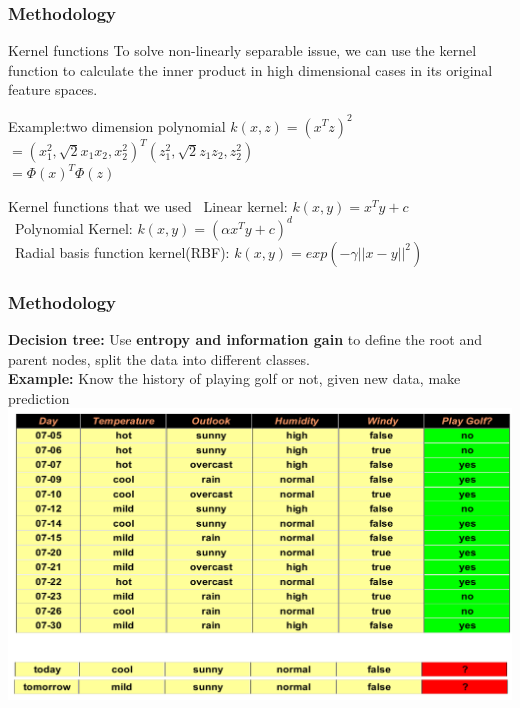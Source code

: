 \documentclass[xcolor={x11names,svgnames,dvipsnames}]{beamer}
\begin{document}
\begin{frame}
\frametitle{Methodology}
\begin{block}{Kernel functions}
To solve non-linearly separable issue, we can use the kernel function to calculate the inner product in high dimensional cases in its original feature spaces.
\end{block}
\begin{block}{Example:two dimension polynomial}
$k(x,z)=(x^Tz)^2$\\
$=(x_1^2,\sqrt{2}x_1x_2,x_2^2)^T(z_1^2,\sqrt{2}z_1z_2,z_2^2)$\\
$=\Phi(x)^T\Phi(z)$\\
\end{block}
\begin{block}{Kernel functions that we used}
\small{
\textbullet\ {Linear kernel:  $k(x,y)=x^Ty+c$}\\
\textbullet\ {Polynomial Kernel:  $k(x,y)=(\alpha x^Ty+c)^d$}\\
\textbullet\ {Radial basis function kernel(RBF):  $k(x,y)=exp(-\gamma||x-y||^2)$}
}
\end{block}
\end{frame}

\begin{frame}
\frametitle{Methodology}
\textbf{Decision tree:}
Use \textbf{entropy and information gain} to define the root and parent nodes, split the data into different classes.\\
\textbf{Example:}
Know the history of playing golf or not, given new data, make prediction\\ 
      \includegraphics[width=1\textwidth, height=0.6\textheight]{decision_tree1.png}
\end{frame}
\end{document}

